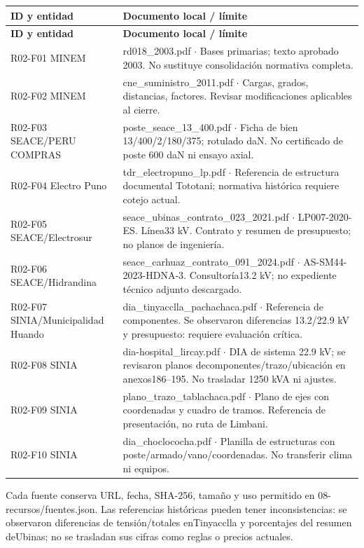 \begingroup\small\setlength{\LTpre}{4pt}\setlength{\LTpost}{6pt}
\begin{longtable}{*{2}{L{\dimexpr\linewidth/2-2\tabcolsep\relax}}}
\toprule
\textbf{ID y entidad} & \textbf{Documento local / límite} \\ \midrule
\endfirsthead
\toprule
\textbf{ID y entidad} & \textbf{Documento local / límite} \\ \midrule
\endhead
R02-F01 MINEM & rd018\_\allowbreak{}2003.pdf \ensuremath{\cdot} Bases primarias; texto aprobado 2003. No sustituye consolidación normativa completa. \\
R02-F02 MINEM & cne\_\allowbreak{}suministro\_\allowbreak{}2011.pdf \ensuremath{\cdot} Cargas, grados, distancias, factores. Revisar modificaciones aplicables al cierre. \\
R02-F03 SEACE/PERU COMPRAS & poste\_\allowbreak{}seace\_\allowbreak{}13\_\allowbreak{}400.pdf \ensuremath{\cdot} Ficha de bien 13/400/2/180/375; rotulado daN. No certificado de poste 600 daN ni ensayo axial. \\
R02-F04 Electro Puno & tdr\_\allowbreak{}electropuno\_\allowbreak{}lp.pdf \ensuremath{\cdot} Referencia de estructura documental Tototani; normativa histórica requiere cotejo actual. \\
R02-F05 SEACE/Electrosur & seace\_\allowbreak{}ubinas\_\allowbreak{}contrato\_\allowbreak{}023\_\allowbreak{}2021.pdf \ensuremath{\cdot} LP007-2020-ES. Línea33 kV. Contrato y resumen de presupuesto; no planos de ingeniería. \\
R02-F06 SEACE/Hidrandina & seace\_\allowbreak{}carhuaz\_\allowbreak{}contrato\_\allowbreak{}091\_\allowbreak{}2024.pdf \ensuremath{\cdot} AS-SM44-2023-HDNA-3. Consultoría13.2 kV; no expediente técnico adjunto descargado. \\
R02-F07 SINIA/Municipalidad Huando & dia\_\allowbreak{}tinyacclla\_\allowbreak{}pachachaca.pdf \ensuremath{\cdot} Referencia de componentes. Se observaron diferencias 13.2/22.9 kV y presupuesto: requiere evaluación crítica. \\
R02-F08 SINIA & dia-hospital\_\allowbreak{}lircay.pdf \ensuremath{\cdot} DIA de sistema 22.9 kV; se revisaron planos decomponentes/trazo/ubicación en anexos186--195. No trasladar 1250 kVA ni ajustes. \\
R02-F09 SINIA & plano\_\allowbreak{}trazo\_\allowbreak{}tablachaca.pdf \ensuremath{\cdot} Plano de ejes con coordenadas y cuadro de tramos. Referencia de presentación, no ruta de Limbani. \\
R02-F10 SINIA & dia\_\allowbreak{}choclococha.pdf \ensuremath{\cdot} Planilla de estructuras con poste/armado/vano/coordenadas. No transferir clima ni equipos. \\
\bottomrule\end{longtable}\endgroup

Cada fuente conserva URL, fecha, SHA-256, tamaño y uso permitido en 08-recursos/fuentes.json. Las referencias históricas pueden tener inconsistencias: se observaron diferencias de tensión/totales enTinyacclla y porcentajes del resumen deUbinas; no se trasladan sus cifras como reglas o precios actuales.

